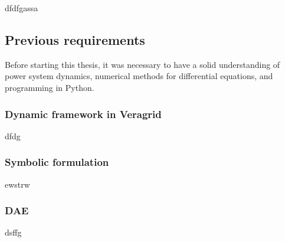 dfdfgassa

\subsection{Previous requirements}

Before starting this thesis, it was necessary to have a solid understanding of power system dynamics, numerical methods for differential equations,
 and programming in Python.

\subsubsection{Dynamic framework in Veragrid}

dfdg

\subsubsection{Symbolic formulation}

ewstrw

\subsubsection{DAE}

dsffg

\newpage
